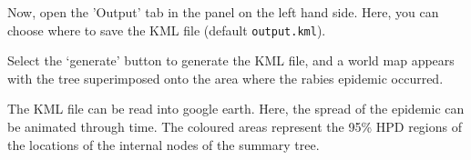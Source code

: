 \documentclass{article}
\begin{document}
Now, open the 'Output' tab in the panel on the left hand side. Here, you can choose where to save the KML file (default {\tt output.kml}).

Select the `generate' button to generate the KML file, and a world map appears with the tree superimposed onto the area where the rabies epidemic occurred.


The KML file can be read into google earth. Here, the spread of the epidemic can be animated through time. The coloured areas represent the 95\% HPD regions of the locations of the internal nodes of the summary tree.
\end{document}
